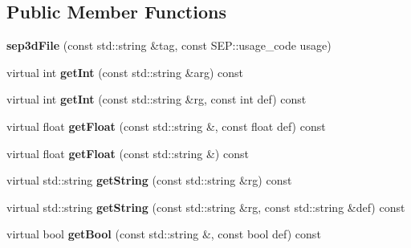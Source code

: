 \subsection*{Public Member Functions}
\begin{DoxyCompactItemize}
\item 
\mbox{\label{class_s_e_p_1_1sep3d_file_af7e58c95a80952b6af7e46854131ce2a}} 
{\bfseries sep3d\+File} (const std\+::string \&tag, const S\+E\+P\+::usage\+\_\+code usage)
\item 
\mbox{\label{class_s_e_p_1_1sep3d_file_a6ec276a8f557002b3775e6d48d171708}} 
virtual int {\bfseries get\+Int} (const std\+::string \&arg) const
\item 
\mbox{\label{class_s_e_p_1_1sep3d_file_a6f8bf5eee3cd2cbfc7876b6ed1549bc0}} 
virtual int {\bfseries get\+Int} (const std\+::string \&rg, const int def) const
\item 
\mbox{\label{class_s_e_p_1_1sep3d_file_ac038ec103b1178aa048ef46449813c81}} 
virtual float {\bfseries get\+Float} (const std\+::string \&, const float def) const
\item 
\mbox{\label{class_s_e_p_1_1sep3d_file_adbb1cb489349ceba214b95f8f49f4159}} 
virtual float {\bfseries get\+Float} (const std\+::string \&) const
\item 
\mbox{\label{class_s_e_p_1_1sep3d_file_a11b95e32aa0e271b64a25b61bc37ee7a}} 
virtual std\+::string {\bfseries get\+String} (const std\+::string \&rg) const
\item 
\mbox{\label{class_s_e_p_1_1sep3d_file_a2805d039223e065be29f39f4d098509f}} 
virtual std\+::string {\bfseries get\+String} (const std\+::string \&rg, const std\+::string \&def) const
\item 
\mbox{\label{class_s_e_p_1_1sep3d_file_a9f10b2d25199680e25b150b13b438b6f}} 
virtual bool {\bfseries get\+Bool} (const std\+::string \&, const bool def) const
\item 
\mbox{\label{class_s_e_p_1_1sep3d_file_a1ad6b4cfb5401850116e7ab97f74e7f9}} 

\end{DoxyCompactItemize}

